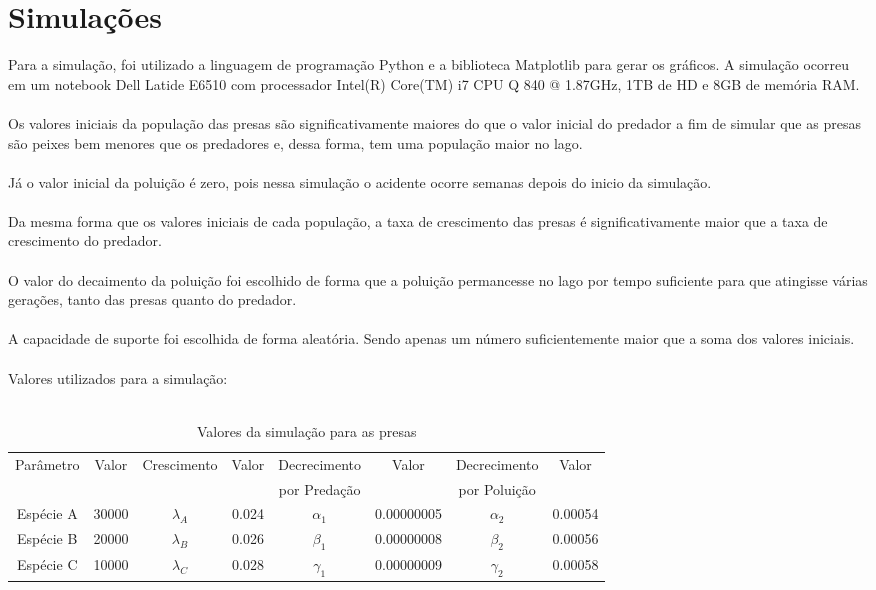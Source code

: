 \documentclass[a4paper]{article}
\begin{document}
\section{Simula\c{c}\~oes}
Para a simula\c{c}\~ao, foi utilizado a linguagem de programa\c{c}\~ao Python e a biblioteca Matplotlib para gerar os gr\'aficos. A simula\c{c}\~ao ocorreu em um notebook Dell Latide E6510 com processador Intel(R) Core(TM) i7 CPU Q 840 @ 1.87GHz, 1TB de HD e 8GB de mem\'oria RAM.
\\
\\
Os valores iniciais da popula\c{c}\~ao das presas s\~ao significativamente maiores do que o valor inicial do predador a fim de simular que as presas s\~ao peixes bem menores que os predadores e, dessa forma, tem uma popula\c{c}\~ao maior no lago.
\\
\\
J\'a o valor inicial da polui\c{c}\~ao \'e zero, pois nessa simula\c{c}\~ao o acidente ocorre semanas depois do inicio da simula\c{c}\~ao.
\\
\\
Da mesma forma que os valores iniciais de cada popula\c{c}\~ao, a taxa de crescimento das presas \'e significativamente maior que a taxa de crescimento do predador.
\\
\\
O valor do decaimento da polui\c{c}\~ao foi escolhido de forma que a polui\c{c}\~ao permancesse no lago por tempo suficiente para que atingisse v\'arias gera\c{c}\~oes, tanto das presas quanto do predador.
\\
\\
A capacidade de suporte foi escolhida de forma aleat\'oria. Sendo apenas um n\'umero suficientemente maior que a soma dos valores iniciais.
\\
\\
Valores utilizados para a simula\c{c}\~ao:
\\
\\
\begin{table}[ht!]
\centering
\caption{Valores da simula\c{c}\~ao para as presas}
\begin{tabular}{|c|c|c|c|c|c|c|c|}
Par\^ametro & Valor & Crescimento& Valor & Decrecimento & Valor& Decrecimento & Valor\\
& & & &por Preda\c{c}\~ao & &por Polui\c{c}\~ao &\\
\hline
Esp\'ecie A & 30000 & $\lambda_A$ & 0.024  & $\alpha_1  $ & 0.00000005  & $\alpha_2 $ & 0.00054   \\
Esp\'ecie B & 20000 & $\lambda_B$ & 0.026  & $\beta_1   $ & 0.00000008  & $\beta_2  $ & 0.00056 \\
Esp\'ecie C & 10000 & $\lambda_C$ & 0.028  & $\gamma_1  $ & 0.00000009  & $\gamma_2 $ & 0.00058  \\
\end{tabular}
\end{table}
\end{document}
